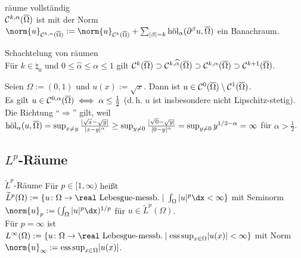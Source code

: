 \begin{Satz}{räume vollständig}\\
    $\C^{k,\alpha}(\overline{\Omega})$ ist mit der Norm
    $\norm{u}_{\C^{k,\alpha}(\overline{\Omega})} :=
    \norm{u}_{\C^k(\overline{\Omega})} +
    \sum_{|\beta|=k} \hol_\alpha(\partial^\beta u, \overline{\Omega})$
    ein Banachraum.
\end{Satz}

\begin{Satz}{Schachtelung von räumen}\\
    Für $k \in \natural_0$ und $0 \le \widehat{\alpha} \le \alpha \le 1$ gilt
    $\C^k(\overline{\Omega}) \supset \C^{k,\widehat{\alpha}}(\overline{\Omega}) \supset
    \C^{k,\alpha}(\overline{\Omega}) \supset \C^{k+1}(\overline{\Omega})$.
\end{Satz}

\begin{Bsp}
    Seien $\Omega := (0, 1)$ und $u(x) := \sqrt{x}$.
    Dann ist $u \in \C^0(\overline{\Omega}) \setminus \C^1(\overline{\Omega})$.\\
    Es gilt $u \in \C^{0,\alpha}(\overline{\Omega}) \iff \alpha \le \frac{1}{2}$
    (d.\,h. $u$ ist insbesondere nicht Lipschitz-stetig).\\
    Die Richtung "`$\Rightarrow$"' gilt, weil\\
    $\hol_\alpha(u, \overline{\Omega})
    = \sup_{x \not= y} \frac{|\sqrt{x} - \sqrt{y}|}{|x - y|^\alpha}
    \ge \sup_{y \not= 0} \frac{|\sqrt{0} - \sqrt{y}|}{|0 - y|^\alpha} =
    \sup_{y \not = 0} y^{1/2-\alpha} = \infty$ für $\alpha > \frac{1}{2}$.
\end{Bsp}

\pagebreak

\subsection{%
    \texorpdfstring{$L^p$}{Lp}-Räume%
}

\begin{Def}{$\widetilde{L}^p$-Räume}
    Für $p \in [1, \infty)$ heißt
    $\widetilde{L}^p(\Omega) :=
    \{\text{$u\colon \Omega \to \real$ Lebesgue-messb.} \;|\; \int_\Omega |u|^p \dx < \infty\}$
    mit Seminorm $\norm{u}_p := (\int_\Omega |u|^p \dx)^{1/p}$ für
    $u \in \widetilde{L}^p(\Omega)$.\\
    Für $p = \infty$ ist $L^\infty(\Omega) :=
    \{\text{$u\colon \Omega \to \real$ Lebesgue-messb.} \;|\;
    \esssup_{x \in \Omega} |u(x)| < \infty\}$
    mit Norm $\norm{u}_\infty := \esssup_{x \in \Omega} |u(x)|$.
\end{Def}

